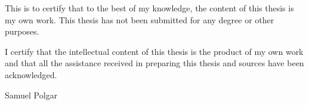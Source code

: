 This is to certify that to the best of my knowledge, the content of this thesis is my own work. This thesis has not been submitted for any degree or other purposes.

I certify that the intellectual content of this thesis is the product of my own work and that all the assistance received in preparing this thesis and sources have been acknowledged.

\vspace{2cm}
\noindent Samuel Polgar

